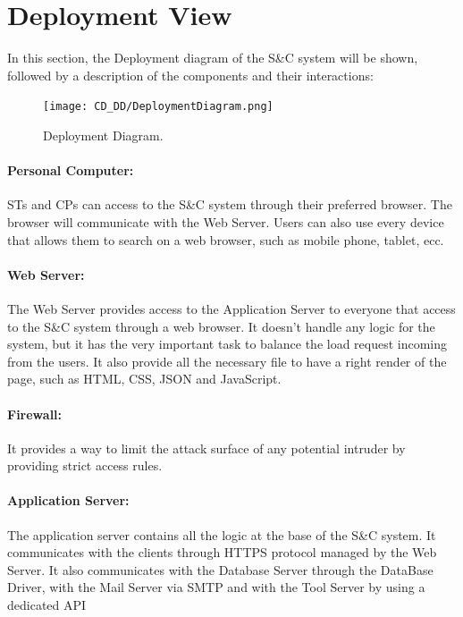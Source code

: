 \section{Deployment View}
\label{sec:deployment_view}%

In this section, the Deployment diagram of the S\&C system will be shown, followed by a description of the components and their interactions:
\begin{figure}[H]
    \begin{center}
        \texttt{[image: CD\_DD/DeploymentDiagram.png]}
        \caption{Deployment Diagram.}
        \label{fig:Deployment_Diagram}%
    \end{center}
\end{figure}

\paragraph{Personal Computer:}
STs and CPs can access to the S\&C system through their preferred browser. The browser will communicate with the Web Server. Users can also use every device that allows them to search on a web browser, such as mobile phone, tablet, ecc.

\paragraph{Web Server:}
The Web Server provides access to the Application Server to everyone that access to the S\&C system through a web browser. It doesn't handle any logic for the system, but it has the very important task to balance the load request incoming from the users. It also provide all the necessary file to have a right render of the page, such as HTML, CSS, JSON and JavaScript.

\paragraph{Firewall:}
It provides a way to limit the attack surface of any potential intruder by providing strict access rules.

\paragraph{Application Server:}
The application server contains all the logic at the base of the S\&C system. It communicates with the clients through HTTPS protocol managed by the Web Server. It also communicates with the Database Server through the DataBase Driver, with the Mail Server via SMTP  and with the Tool Server by using a dedicated API

